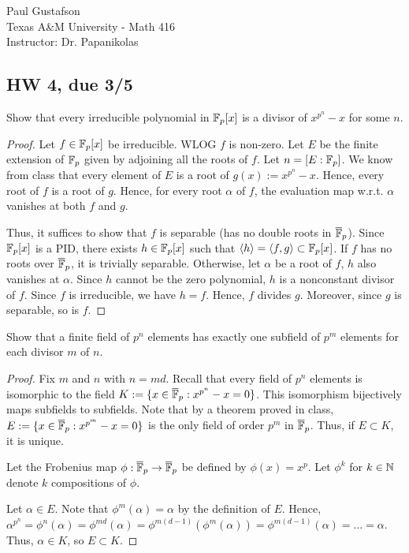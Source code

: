 \documentclass{article}
\begin{document}
\noindent Paul Gustafson\\
\noindent Texas A\&M University - Math 416\\
\noindent Instructor: Dr. Papanikolas

\subsection*{HW 4, due 3/5}

 Show that every irreducible polynomial in $\mathbb{F}_p[x]$ is a divisor of $x^{p^n} - x$ for some $n$.
\begin{proof}
Let $f \in \mathbb{F}_p[x]$ be irreducible. WLOG $f$ is non-zero.  Let $E$ be the finite extension of $\mathbb{F}_p$ given by adjoining all the roots of $f$. Let $n = [E : \mathbb{F}_p]$. We know from class that every element of $E$ is a root of $g(x) :=  x^{p^n} - x$. Hence, every root of $f$ is a root of $g$. Hence, for every root $\alpha$ of $f$, the evaluation map w.r.t. $\alpha$ vanishes at both $f$ and $g$.

Thus, it suffices to show that $f$ is separable (has no double roots in ${\overline{\mathbb{F}}_p}$). Since $\mathbb{F}_p[x]$ is a PID, there exists $h \in \mathbb{F}_p[x]$ such that $\langle h \rangle = \langle f, g \rangle \subset \mathbb{F}_p[x]$.  If $f$ has no roots over $\overline{\mathbb{F}}_p$, it is trivially separable. Otherwise, let $\alpha$ be a root of $f$, $h$ also vanishes at $\alpha$.  Since $h$ cannot be the zero polynomial, $h$ is a nonconstant divisor of $f$. Since $f$ is irreducible, we have $h=f$. Hence, $f$ divides $g$. Moreover, since $g$ is separable, so is $f$.
\end{proof}

 Show that a finite field of $p^n$ elements has exactly one subfield of $p^m$ elements for each divisor $m$ of $n$.
\begin{proof}
Fix $m$ and $n$ with $n = m d$. Recall that every field of $p^n$ elements is isomorphic to the field $K := \{x \in \overline{\mathbb{F}}_p : x^{p^n} - x = 0\}$. This isomorphism bijectively maps subfields to subfields.  Note that by a theorem proved in class, $E := \{x \in \overline{\mathbb{F}}_p : x^{p^m} - x = 0\}$ is the only field of order $p^m$ in $\overline{\mathbb{F}}_p$.  Thus, if $E \subset K$, it is unique.

Let the Frobenius map $\phi:\overline{\mathbb{F}}_p \to \overline{\mathbb{F}}_p$ be defined by $\phi(x) = x^p$.  Let $\phi^k$ for $k \in \mathbb{N}$ denote $k$ compositions of $\phi$.

Let $\alpha \in E$. Note that $\phi^m(\alpha) = \alpha$ by the definition of $E$.
Hence, $\alpha^{p^n}  = \phi^n(\alpha) = \phi^{md}(\alpha) = \phi^{m(d-1)}(\phi^m(\alpha)) = \phi^{m(d-1)}(\alpha) = \ldots = \alpha$.
Thus, $\alpha \in K$, so $E \subset K$.
\end{proof}
\end{document}
